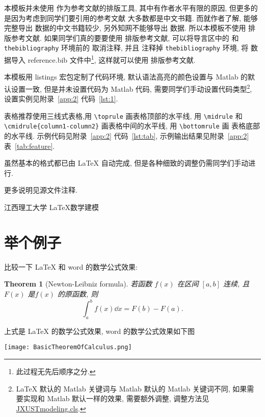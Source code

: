 \documentclass[timesfont,no-math]{JXUSTmodeling}%
\begin{document}
	本模板并未使用  作为参考文献的排版工具, 其中有作者水平有限的原因, 但更多的是因为考虑到同学们要引用的参考文献
	大多数都是中文书籍. 而就作者了解, 能够完整导出  数据的中文书籍较少, 另外知网不能够导出  数据.
	所以本模板不使用  排版参考文献. 如果同学们真的要要使用  排版参考文献, 可以将导言区中的
	\verb|| 和 \verb|thebibliography| 环境前的 \verb|| 取消注释, 并且
	注释掉 \verb|thebibliography| 环境, 将  数据导入 reference.bib 文件中\footnote{此过程无先后顺序之分.},
	这样就可以使用  排版参考文献.
	
	本模板用 listings 宏包\cite{listings-package}定制了代码环境, 默认语法高亮的颜色设置与 Matlab 的默认设置一致,
	但是并未设置代码为 Matlab 代码, 需要同学们手动设置代码类型\footnote{\LaTeX{} 默认的 Matlab 关键词与 Matlab 默认的 Matlab 关键词不同, 如果需要实现和 Matlab 默认一样的效果, 需要额外调整, 调整方法见 \href{JXUSTmodeling.cls}{JXUSTmodeling.cls}.}, 
	设置实例见附录~\ref{app:2} 代码~\ref{lst:1}.
	
	表格推荐使用三线式表格,用 \verb|\toprule| 画表格顶部的水平线,
	用 \verb|\midrule| 和 \lstinline[basicstyle=\ttfamily]|\cmidrule{column1-column2}| 画表格中间的水平线, 用 \verb|\bottomrule| 画
	表格底部的水平线. 示例代码见附录~\ref{app:2} 代码~\ref{lst:tab},
	示例输出结果见附录~\ref{app:2} 表~\ref{tab:feature}.
	
	虽然基本的格式都已由 \LaTeX{} 自动完成, 但是各种细致的调整仍需同学们手动进行. 
	
	更多说明见源文件注释.

	
	\setcounter{page}{1}%
	\quad 江西理工大学 \quad \LaTeX{}\quad 数学建模 \quad 
	\newpage
	\section*{举个例子}
	比较一下 \LaTeX{} 和 word 的数学公式效果:
	\newtheorem*{thm}{Theorem}
	
	\begin{thm}[Newton-Leibniz formula]
	若函数 $f(x)$ 在区间 $[a,b]$ 连续, 且 $F(x)$ 是$f(x)$ 的原函数, 则
	\[
		\int_a^b f(x) \dd x= F(b) - F(a) .
	\]
	\end{thm}
	上式是 \LaTeX{} 的数学公式效果, word 的数学公式效果如下图
	\begin{center}
	\texttt{[image: BasicTheoremOfCalculus.png]}
	\end{center}
	
\end{document}
